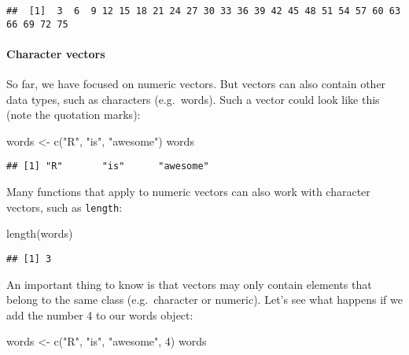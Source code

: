 \documentclass[
]{article}
\newenvironment{Shaded}{\begin{snugshade}}{\end{snugshade}}
\newcommand{\DecValTok}[1]{\textcolor[rgb]{0.00,0.00,0.81}{#1}}
\newcommand{\FunctionTok}[1]{\textcolor[rgb]{0.00,0.00,0.00}{#1}}
\newcommand{\NormalTok}[1]{#1}
\newcommand{\OtherTok}[1]{\textcolor[rgb]{0.56,0.35,0.01}{#1}}
\newcommand{\StringTok}[1]{\textcolor[rgb]{0.31,0.60,0.02}{#1}}
\begin{document}
\begin{verbatim}
##  [1]  3  6  9 12 15 18 21 24 27 30 33 36 39 42 45 48 51 54 57 60 63 66 69 72 75
\end{verbatim}

\hypertarget{character-vectors}{%
\paragraph{Character vectors}\label{character-vectors}}

So far, we have focused on numeric vectors. But vectors can also contain
other data types, such as characters (e.g.~words). Such a vector could
look like this (note the quotation marks):

\begin{Shaded}
\begin{Highlighting}[]
\NormalTok{words }\OtherTok{\textless{}{-}} \FunctionTok{c}\NormalTok{(}\StringTok{"R"}\NormalTok{, }\StringTok{"is"}\NormalTok{, }\StringTok{"awesome"}\NormalTok{)}
\NormalTok{words}
\end{Highlighting}
\end{Shaded}

\begin{verbatim}
## [1] "R"       "is"      "awesome"
\end{verbatim}

Many functions that apply to numeric vectors can also work with
character vectors, such as \texttt{length}:

\begin{Shaded}
\begin{Highlighting}[]
\FunctionTok{length}\NormalTok{(words)}
\end{Highlighting}
\end{Shaded}

\begin{verbatim}
## [1] 3
\end{verbatim}

An important thing to know is that vectors may only contain elements
that belong to the same class (e.g.~character or numeric). Let's see
what happens if we add the number 4 to our words object:

\begin{Shaded}
\begin{Highlighting}[]
\NormalTok{words }\OtherTok{\textless{}{-}} \FunctionTok{c}\NormalTok{(}\StringTok{"R"}\NormalTok{, }\StringTok{"is"}\NormalTok{, }\StringTok{"awesome"}\NormalTok{, }\DecValTok{4}\NormalTok{)}
\NormalTok{words}
\end{Highlighting}
\end{Shaded}
\end{document}
